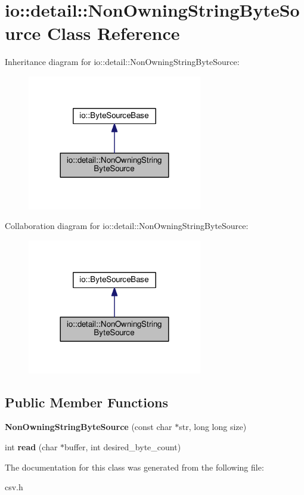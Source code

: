 \section{io\+:\+:detail\+:\+:Non\+Owning\+String\+Byte\+Source Class Reference}
\label{classio_1_1detail_1_1_non_owning_string_byte_source}


Inheritance diagram for io\+:\+:detail\+:\+:Non\+Owning\+String\+Byte\+Source\+:\nopagebreak
\begin{figure}[H]
\begin{center}
\leavevmode
\includegraphics[width=216pt]{classio_1_1detail_1_1_non_owning_string_byte_source__inherit__graph}
\end{center}
\end{figure}


Collaboration diagram for io\+:\+:detail\+:\+:Non\+Owning\+String\+Byte\+Source\+:\nopagebreak
\begin{figure}[H]
\begin{center}
\leavevmode
\includegraphics[width=216pt]{classio_1_1detail_1_1_non_owning_string_byte_source__coll__graph}
\end{center}
\end{figure}
\subsection*{Public Member Functions}
\begin{DoxyCompactItemize}
\item 
{\bfseries Non\+Owning\+String\+Byte\+Source} (const char $\ast$str, long long size)\label{classio_1_1detail_1_1_non_owning_string_byte_source_a8fd604017b38e20f90386b6e10bd95a3}

\item 
int {\bfseries read} (char $\ast$buffer, int desired\+\_\+byte\+\_\+count)\label{classio_1_1detail_1_1_non_owning_string_byte_source_aba194be7e3a141f40d683db483a620bb}

\end{DoxyCompactItemize}


The documentation for this class was generated from the following file\+:\begin{DoxyCompactItemize}
\item 
csv.\+h\end{DoxyCompactItemize}
